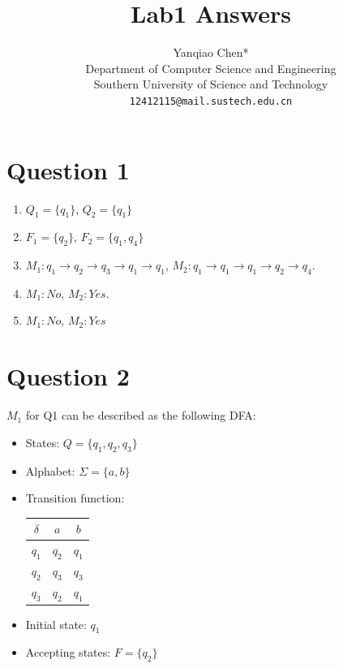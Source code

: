 \documentclass[a4paper, UTF-8]{article}
\theoremstyle{plain}
\begin{document}
\title{\bf{Lab1 Answers}}

\author{Yanqiao Chen*\\ 
  Department of Computer Science and Engineering\\
  Southern University of Science and Technology\\
  \texttt{12412115@mail.sustech.edu.cn}
  }

\maketitle

\section{Question 1}

\begin{enumerate}
    \item [a.] $Q_1 =\{ q_1 \}$, $Q_2 = \{q_1\}$
    \item [b.] $F_1 = \{q_2\}$, $F_2 = \{q_1, q_4\}$
    \item [c.] $M_1: q_1 \to q_2 \to q_3 \to q_1 \to q_1$, $M_2: q_1 \to q_1 \to q_1 \to q_2 \to q_4$.
    \item [d.] $M_1: No$, $M_2: Yes$.
    \item [e.] $M_1: No$, $M_2: Yes$
\end{enumerate}

\section{Question 2}

$M_1$ for Q1 can be described as the following DFA:

\begin{itemize}
    \item States: $Q = \{q_1, q_2, q_3\}$
    \item Alphabet: $\Sigma = \{a, b\}$
    \item Transition function: 
            \begin{center}
              \begin{tabular}{c|c|c}
                  $\delta$ & $a$ & $b$ \\
                  \hline
                  $q_1$ & $q_2$ & $q_1$ \\
                  $q_2$ & $q_3$ & $q_3$ \\
                  $q_3$ & $q_2$ & $q_1$
              \end{tabular}
            \end{center}
    \item Initial state: $q_1$
    \item Accepting states: $F = \{q_2\}$
\end{itemize}
\end{document}

